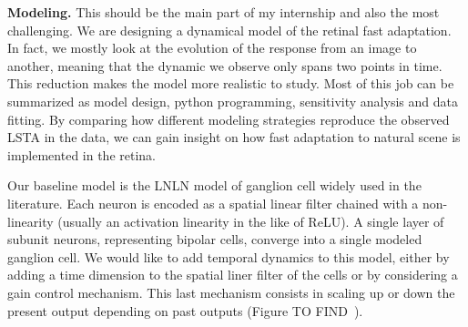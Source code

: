 \textbf{Modeling.} This should be the main part of my internship and also the
most challenging. We are designing a dynamical model of the retinal fast
adaptation. In fact, we mostly look at the evolution of the response from an
image to another, meaning that the dynamic we observe only spans two points in
time. This reduction makes the model more realistic to study. Most of this job
can be summarized as model design, python programming, sensitivity analysis and
data fitting. By comparing how different modeling strategies reproduce the
observed LSTA in the data, we can gain insight on how fast adaptation to
natural scene is implemented in the retina.

Our baseline model is the LNLN model of ganglion cell widely used in the
literature. Each neuron is encoded as a spatial linear filter chained with a
non-linearity (usually an activation linearity in the like of ReLU). A single
layer of subunit neurons, representing bipolar cells, converge into a single
modeled ganglion cell.	We would like to add temporal dynamics to this model,
either by adding a time dimension to the spatial liner filter of the cells or
by considering a gain control mechanism. This last mechanism consists in
scaling up or down the present output depending on past outputs (Figure
TO FIND~\cite{}).

